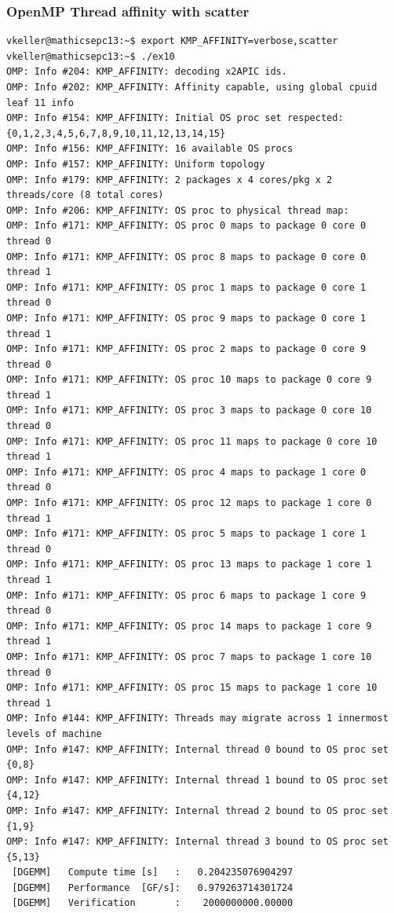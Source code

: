 \begin{frame}[containsverbatim]
  \frametitle{OpenMP Thread affinity with scatter}
  \begingroup
  \fontsize{6pt}{12pt}\linespread{0.5}\selectfont
\begin{verbatim}
vkeller@mathicsepc13:~$ export KMP_AFFINITY=verbose,scatter
vkeller@mathicsepc13:~$ ./ex10
OMP: Info #204: KMP_AFFINITY: decoding x2APIC ids.
OMP: Info #202: KMP_AFFINITY: Affinity capable, using global cpuid leaf 11 info
OMP: Info #154: KMP_AFFINITY: Initial OS proc set respected: {0,1,2,3,4,5,6,7,8,9,10,11,12,13,14,15}
OMP: Info #156: KMP_AFFINITY: 16 available OS procs
OMP: Info #157: KMP_AFFINITY: Uniform topology
OMP: Info #179: KMP_AFFINITY: 2 packages x 4 cores/pkg x 2 threads/core (8 total cores)
OMP: Info #206: KMP_AFFINITY: OS proc to physical thread map:
OMP: Info #171: KMP_AFFINITY: OS proc 0 maps to package 0 core 0 thread 0
OMP: Info #171: KMP_AFFINITY: OS proc 8 maps to package 0 core 0 thread 1
OMP: Info #171: KMP_AFFINITY: OS proc 1 maps to package 0 core 1 thread 0
OMP: Info #171: KMP_AFFINITY: OS proc 9 maps to package 0 core 1 thread 1
OMP: Info #171: KMP_AFFINITY: OS proc 2 maps to package 0 core 9 thread 0
OMP: Info #171: KMP_AFFINITY: OS proc 10 maps to package 0 core 9 thread 1
OMP: Info #171: KMP_AFFINITY: OS proc 3 maps to package 0 core 10 thread 0
OMP: Info #171: KMP_AFFINITY: OS proc 11 maps to package 0 core 10 thread 1
OMP: Info #171: KMP_AFFINITY: OS proc 4 maps to package 1 core 0 thread 0
OMP: Info #171: KMP_AFFINITY: OS proc 12 maps to package 1 core 0 thread 1
OMP: Info #171: KMP_AFFINITY: OS proc 5 maps to package 1 core 1 thread 0
OMP: Info #171: KMP_AFFINITY: OS proc 13 maps to package 1 core 1 thread 1
OMP: Info #171: KMP_AFFINITY: OS proc 6 maps to package 1 core 9 thread 0
OMP: Info #171: KMP_AFFINITY: OS proc 14 maps to package 1 core 9 thread 1
OMP: Info #171: KMP_AFFINITY: OS proc 7 maps to package 1 core 10 thread 0
OMP: Info #171: KMP_AFFINITY: OS proc 15 maps to package 1 core 10 thread 1
OMP: Info #144: KMP_AFFINITY: Threads may migrate across 1 innermost levels of machine
OMP: Info #147: KMP_AFFINITY: Internal thread 0 bound to OS proc set {0,8}
OMP: Info #147: KMP_AFFINITY: Internal thread 1 bound to OS proc set {4,12}
OMP: Info #147: KMP_AFFINITY: Internal thread 2 bound to OS proc set {1,9}
OMP: Info #147: KMP_AFFINITY: Internal thread 3 bound to OS proc set {5,13}
 [DGEMM]   Compute time [s]   :   0.204235076904297
 [DGEMM]   Performance  [GF/s]:   0.979263714301724
 [DGEMM]   Verification       :    2000000000.00000
\end{verbatim}
\endgroup
\end{frame}


